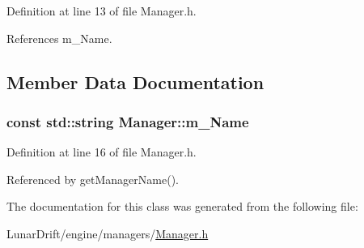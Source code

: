 Definition at line 13 of file Manager.\+h.



References m\+\_\+\+Name.



\subsection{Member Data Documentation}
\subsubsection[{\texorpdfstring{m\+\_\+\+Name}{m_Name}}]{\setlength{\rightskip}{0pt plus 5cm}const std\+::string Manager\+::m\+\_\+\+Name\hspace{0.3cm}{\ttfamily [private]}}\hypertarget{class_manager_a746ab3e8df717773513e662ad7305259}{}\label{class_manager_a746ab3e8df717773513e662ad7305259}


Definition at line 16 of file Manager.\+h.



Referenced by get\+Manager\+Name().



The documentation for this class was generated from the following file\+:\begin{DoxyCompactItemize}
\item 
Lunar\+Drift/engine/managers/\hyperlink{_manager_8h}{Manager.\+h}\end{DoxyCompactItemize}

